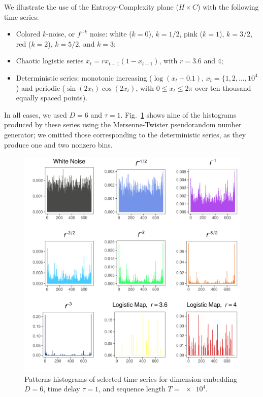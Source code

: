 \documentclass[alpha-refs]{wiley-article}
\begin{document}
We illustrate the use of the Entropy-Complexity plane ($H\times C$) with the following time series:
\begin{itemize}
\item Colored $k$-noise, or $f^{-k}$ noise: white ($k=0$), $k=1/2$, pink ($k=1$), $k=3/2$, red ($k=2$), $k=5/2$, and $k=3$;
\item Chaotic logistic series $x_t = r x_{t-1} (1 - x_{t-1})$, with $r=3.6$ and $4$;
\item Deterministic series: monotonic increasing ($\log(x_t+0.1)$, $x_t=\{1,2,\dots,10^4$) and periodic ($\sin(2x_t)\cos(2x_t)$, with $0\leq x_t\leq 2\pi$ over ten thousand equally spaced points).
\end{itemize}
In all cases, we used $D=6$ and $\tau=1$.
Fig.~\ref{fig:Histograms} shows nine of the histograms produced by these series using the Mersenne-Twister pseudorandom number generator;
we omitted those corresponding to the deterministic series, as they produce one and two nonzero bins.

\begin{figure}[hbt]
\includegraphics[width=\linewidth]{Figures/h.pdf}
\caption{Patterns histograms of selected time series  for dimension embedding $D = 6$, time delay $\tau = 1$, and sequence length $T = \num[scientific-notation=true]{e4}$.}
\label{fig:Histograms}
\end{figure}
\end{document}
